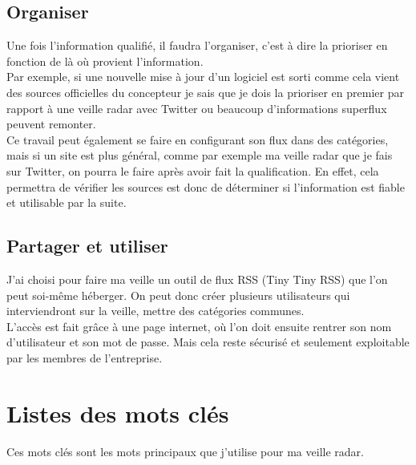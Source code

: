 \documentclass[11pt,a4paper,oneside]{book}
\begin{document}
\subsection{Organiser}

Une fois l'information qualifié, il faudra l'organiser, c'est à dire la prioriser en fonction de là où provient l'information. \\

Par exemple, si une nouvelle mise à jour d'un logiciel est sorti comme cela vient des sources officielles du concepteur je sais que je dois la prioriser en premier par rapport à une veille radar avec Twitter ou beaucoup d'informations superflux peuvent remonter. \\

Ce travail peut également se faire en configurant son flux dans des catégories, mais si un site est plus général, comme par exemple ma veille radar que je fais sur Twitter, on pourra le faire après avoir fait la qualification.
En effet, cela permettra de vérifier les sources est donc de déterminer si l'information est fiable et utilisable par la suite.

\subsection{Partager et utiliser}

J'ai choisi pour faire ma veille un outil de flux RSS (Tiny Tiny RSS) que l'on peut soi-même héberger.
On peut donc créer plusieurs utilisateurs qui interviendront sur la veille, mettre des catégories communes. \\

L'accès est fait grâce à une page internet, où l'on doit ensuite rentrer son nom d'utilisateur et son mot de passe. Mais cela reste sécurisé et seulement exploitable par les membres de l'entreprise. \\

\newpage

\section{Listes des mots clés}

Ces mots clés sont les mots principaux que j'utilise pour ma veille radar. \\
\end{document}
